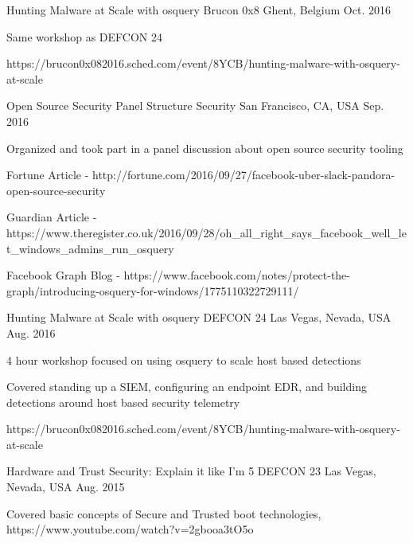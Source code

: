 \begin{cventries}

\cventry
{Hunting Malware at Scale with osquery} %
{Brucon 0x8} %
{Ghent, Belgium} %
{Oct. 2016} %
{ %
\begin{cvitems}
\item {Same workshop as DEFCON 24}
\item {https://brucon0x082016.sched.com/event/8YCB/hunting-malware-with-osquery-at-scale}
\end{cvitems}
}


\cventry
{Open Source Security Panel} %
{Structure Security} %
{San Francisco, CA, USA} %
{Sep. 2016} %
{ %
\begin{cvitems}
\item {Organized and took part in a panel discussion about open source security tooling}
\item {Fortune Article - http://fortune.com/2016/09/27/facebook-uber-slack-pandora-open-source-security}
\item {Guardian Article - https://www.theregister.co.uk/2016/09/28/oh\_all\_right\_says\_facebook\_well\_let\_windows\_admins\_run\_osquery}
\item {Facebook Graph Blog - https://www.facebook.com/notes/protect-the-graph/introducing-osquery-for-windows/1775110322729111/}
\end{cvitems}
}


\cventry
{Hunting Malware at Scale with osquery} %
{DEFCON 24} %
{Las Vegas, Nevada, USA} %
{Aug. 2016} %
{ %
\begin{cvitems}
\item {4 hour workshop focused on using osquery to scale host based detections}
\item {Covered standing up a SIEM, configuring an endpoint EDR, and building detections around host based security telemetry}
\item {https://brucon0x082016.sched.com/event/8YCB/hunting-malware-with-osquery-at-scale}
\end{cvitems}
}


\cventry
{Hardware and Trust Security: Explain it like I’m 5} %
{DEFCON 23} %
{Las Vegas, Nevada, USA} %
{Aug. 2015} %
{ %
\begin{cvitems}
\item {Covered basic concepts of Secure and Trusted boot technologies, https://www.youtube.com/watch?v=2gbooa3tO5o}
\end{cvitems}
}


\end{cventries}
